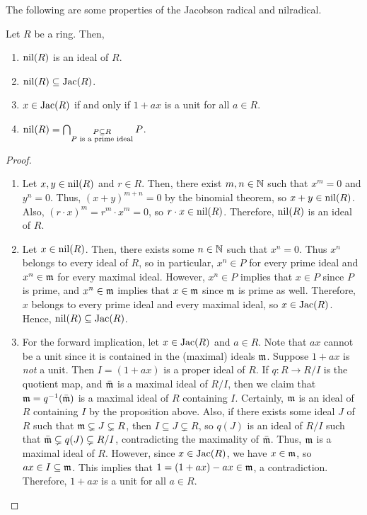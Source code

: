 The following are some properties of the Jacobson radical and nilradical.
\begin{proposition}
    Let $R$ be a ring. Then,
    \begin{enumerate}
        \item $\operatorname{nil}(R)$ is an ideal of $R$.
        \item $\operatorname{nil}(R) \subseteq \operatorname{Jac}(R)$.
        \item $x \in \operatorname{Jac}(R)$ if and only if $1+ax$ is a unit for all $a \in R$.
        \item $\operatorname{nil}(R) = \bigcap_{\substack{P \subseteq R \\ P \text{ is a prime ideal}}} P$.
    \end{enumerate}
\end{proposition}

\begin{proof}
    \begin{enumerate}
        \item Let $x,y \in \operatorname{nil}(R)$ and $r \in R$. Then, there exist $m,n \in \mathbb{N}$ such that $x^{m} = 0$ and $y^{n} = 0$. Thus, $(x + y)^{m+n} = 0$ by the binomial theorem, so $x + y \in \operatorname{nil}(R)$. Also, $(r \cdot x)^{m} = r^{m} \cdot x^{m} = 0$, so $r \cdot x \in \operatorname{nil}(R)$. Therefore, $\operatorname{nil}(R)$ is an ideal of $R$.
        \item Let $x \in \operatorname{nil}(R)$. Then, there exists some $n \in \mathbb{N}$ such that $x^{n} = 0$. Thus $x^{n}$ belongs to every ideal of $R$, so in particular, $x^{n} \in P$ for every prime ideal and $x^{n} \in \mathfrak{m}$ for every maximal ideal. However, $x^{n} \in P$ implies that $x \in P$ since $P$ is prime, and $x^{n} \in \mathfrak{m}$ implies that $x \in \mathfrak{m}$ since $\mathfrak{m}$ is prime as well. Therefore, $x$ belongs to every prime ideal and every maximal ideal, so $x \in \operatorname{Jac}(R)$. Hence, $\operatorname{nil}(R) \subseteq \operatorname{Jac}(R)$.
        \item For the forward implication, let $x \in \operatorname{Jac}(R)$ and $a \in R$. Note that $ax$ cannot be a unit since it is contained in the (maximal) ideals $\mathfrak{m}$. Suppose $1+ax$ is \textit{not} a unit. Then $I = (1+ax)$ is a proper ideal of $R$. If $q : R \to R/I$ is the quotient map, and $\bar{\mathfrak{m}}$ is a maximal ideal of $R/I$, then we claim that $\mathfrak{m} = q^{-1}(\bar{\mathfrak{m}})$ is a maximal ideal of $R$ containing $I$. Certainly, $\mathfrak{m}$ is an ideal of $R$ containing $I$ by the proposition above. Also, if there exists some ideal $J$ of $R$ such that $\mathfrak{m} \subsetneq J \subsetneq R$, then $I \subseteq J \subsetneq R$, so $q(J)$ is an ideal of $R/I$ such that $\bar{\mathfrak{m}} \subsetneq q(J) \subsetneq R/I$, contradicting the maximality of $\bar{\mathfrak{m}}$. Thus, $\mathfrak{m}$ is a maximal ideal of $R$. However, since $x \in \operatorname{Jac}(R)$, we have $x \in \mathfrak{m}$, so $ax \in I \subseteq \mathfrak{m}$. This implies that $1 = (1 + ax) - ax \in \mathfrak{m}$, a contradiction. Therefore, $1 + ax$ is a unit for all $a \in R$.
        

\end{enumerate}
\end{proof}
